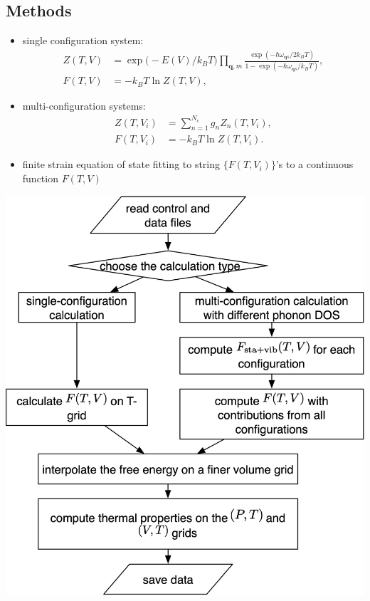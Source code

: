 \documentclass[13pt,aspectratio=169]{beamer}
\begin{document}
\subsection{Methods}
\begin{frame}{\subsecname}
	\begin{itemize}[<+(1)->]
		\item single configuration system:
		      \begin{align}
			      Z(T, V) & = \exp\big( -{E(V)}/{k_B T} \big) \prod_{\bm{q}, m} \frac{\exp(-\hbar \omega_{\bm{q}s}/2k_B T)}{1 - \exp(-\hbar \omega_{\bm{q}s}/k_B T)}, \\
			      F(T, V) & = -k_B T \ln Z(T, V),
		      \end{align}
		\item multi-configuration systems:
		      \begin{align}
			      Z(T, V_i) & = \sum_{n=1}^{N_c} g_n Z_n (T, V_i), \\
			      F(T, V_i) & = -k_B T \ln Z(T, V_i).
		      \end{align}
		\item finite strain equation of state fitting to string $\{F(T, V_i)\}$’s to a continuous function $F(T, V)$
	\end{itemize}
\end{frame}

\begin{frame}{\subsecname}
	\centering
	\includegraphics[height=0.95\textheight]{images/flow}%
\end{frame}
\end{document}
